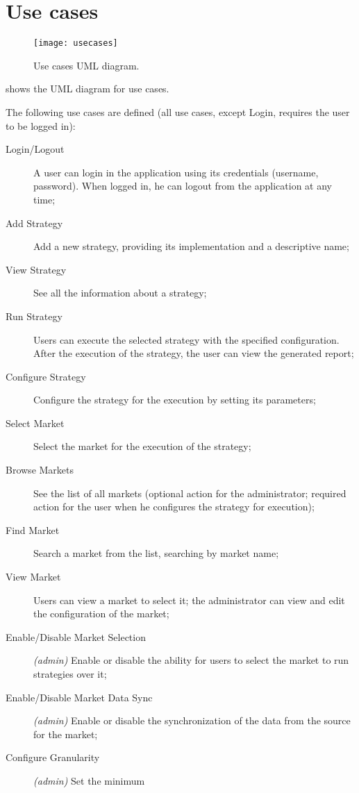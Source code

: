 \chapter{Use cases}\label{ch:usecases}

\begin{figure}[p]
	\texttt{[image: usecases]}
	\caption{Use cases UML diagram.}\label{fig:usecases}
\end{figure}

 shows the UML diagram for use cases.

The following use cases are defined (all use cases, except Login, requires the
user to be logged in):
\begin{description}
	\item[Login/Logout] A user can login in the application using its
		credentials (username, password). When logged in, he can logout
		from the application at any time;
	\item[Add Strategy] Add a new strategy, providing its implementation and
		a descriptive name;
	\item[View Strategy] See all the information about a strategy;
	\item[Run Strategy] Users can execute the selected strategy with the
		specified configuration. After the execution of the strategy,
		the user can view the generated report;
	\item[Configure Strategy] Configure the strategy for the execution by
		setting its parameters;
	\item[Select Market] Select the market for the execution of the
		strategy;
	\item[Browse Markets] See the list of all markets (optional action for
		the administrator; required action for the user when he
		configures the strategy for execution);
	\item[Find Market] Search a market from the list, searching by market
		name;
	\item[View Market] Users can view a market to select it; the
		administrator can view and edit the configuration of the market;
	\item[Enable/Disable Market Selection] \textit{(admin)} Enable or
		disable the ability for users to select the market to run
		strategies over it;
	\item[Enable/Disable Market Data Sync] \textit{(admin)} Enable or
		disable the synchronization of the data from the source for the
		market;
	\item[Configure Granularity] \textit{(admin)} Set the minimum

\end{description}

